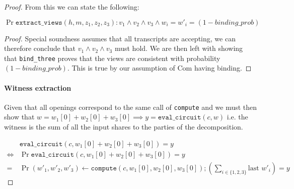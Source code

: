 \begin{proof}
  From this we can state the following:
  \begin{lemma}
    \label{lem:consistent-views}
    $\Pr{\texttt{extract\_views}(h, m, z_1, z_2, z_3) : v_1 \land v_2 \land v_3 \land w_{i} =
      w'_{i}} = (1-binding\_prob)$
  \end{lemma}
  \begin{proof}
    Special soundness assumes that all transcripts are accepting, we can
    therefore conclude that $v_{1} \land v_{2} \land v_{3}$ must hold.
    We are then left with showing that \texttt{bind\_three} proves that the
    views are consistent with probability $(1-binding\_prob)$. This is true by
    our assumption of Com having binding.
  \end{proof}


  \paragraph{Witness extraction}
  Given that all openings correspond to the same call of \texttt{compute} and
   we must then show that
  $w = w_{1}[0] + w_{2}[0] + w_{3}[0] \implies y = \texttt{eval\_circuit}(c, w)$
  i.e. the witness is the sum of all the input shares to the parties of the
  decomposition.

  \begin{align*}
    &\texttt{eval\_circuit}(c, w_{1}[0] + w_{2}[0] + w_{3}[0]) = y \\
    \iff& \Pr{\texttt{eval\_circuit}(c, w_{1}[0] + w_{2}[0] + w_{3}[0]) = y} \\
      =& \Pr{(w'_{1}, w'_{2}, w'_{3}) \leftarrow \texttt{compute}(c, w_{1}[0], w_{2}[0], w_{3}[0]); \left(\sum_{i \in \{1,2,3\}} \text{last
         }w'_{i} \right) = y}
  \end{align*}


\end{proof}
